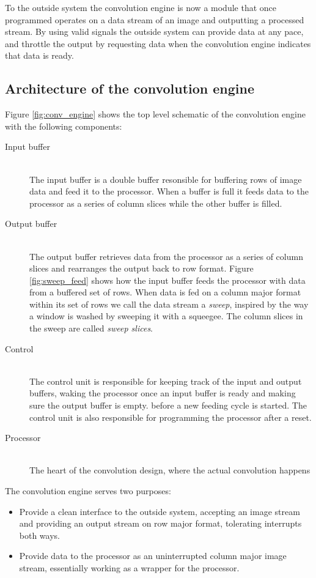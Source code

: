 To the outside system the convolution engine is now a module that once programmed operates on a data stream of an image and outputting a processed stream. 
By using valid signals the outside system can provide data at any pace, and throttle the output by requesting data when the convolution engine indicates that data is ready. 

\subsection{Architecture of the convolution engine}

Figure \ref{fig:conv_engine} shows the top level schematic of the convolution engine with the following components:

\begin{description}
    \item[Input buffer] \hfill\\
        The input buffer is a double buffer resonsible for buffering rows of image data and feed it to the processor.
        When a buffer is full it feeds data to the processor as a series of column slices while the other buffer is filled.
    \item[Output buffer] \hfill\\
        The output buffer retrieves data from the processor as a series of column slices and rearranges the output back to row format.
        Figure \ref{fig:sweep_feed} shows how the input buffer feeds the processor with data from a buffered set of rows.
        When data is fed on a column major format within its set of rows we call the data stream a \textit{sweep}, inspired by the way a window is washed by sweeping it with a squeegee.
        The column slices in the sweep are called \textit{sweep slices}.
    \item[Control] \hfill\\
        The control unit is responsible for keeping track of the input and output buffers, waking the processor once an input buffer is ready and making sure the output buffer is empty.
        before a new feeding cycle is started.
        The control unit is also responsible for programming the processor after a reset.
    \item[Processor] \hfill\\
        The heart of the convolution design, where the actual convolution happens
\end{description}

The convolution engine serves two purposes:
\begin{itemize}
    \item Provide a clean interface to the outside system, accepting an image stream and providing an output stream on row major format, tolerating interrupts both ways.
    \item Provide data to the processor as an uninterrupted column major image stream, essentially working as a wrapper for the processor.
\end{itemize}

